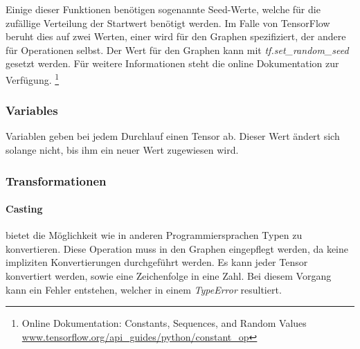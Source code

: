 \noindent
Einige dieser Funktionen benötigen sogenannte Seed-Werte, welche für die zufällige Verteilung der Startwert benötigt werden. 
Im Falle von TensorFlow beruht dies auf zwei Werten, einer wird für den Graphen spezifiziert, der andere für Operationen selbst. 
Der Wert für den Graphen kann mit \textit{tf.set\_random\_seed} gesetzt werden. 
Für weitere Informationen steht die online Dokumentation zur Verfügung. \footnote{Online Dokumentation: Constants, Sequences, and Random Values  \url{www.tensorflow.org/api_guides/python/constant_op}}

\subsubsection{Variables}

Variablen geben bei jedem Durchlauf einen Tensor ab.
Dieser Wert ändert sich solange nicht, bis ihm ein neuer Wert zugewiesen wird. 

\subsubsection{Transformationen}

\paragraph{Casting} bietet die Möglichkeit wie in anderen Programmiersprachen Typen zu konvertieren. 
Diese Operation muss in den Graphen eingepflegt werden, da keine impliziten Konvertierungen durchgeführt werden. 
Es kann jeder Tensor konvertiert werden, sowie eine Zeichenfolge in eine Zahl. 
Bei diesem Vorgang kann ein Fehler entstehen, welcher in einem \textit{TypeError} resultiert.

